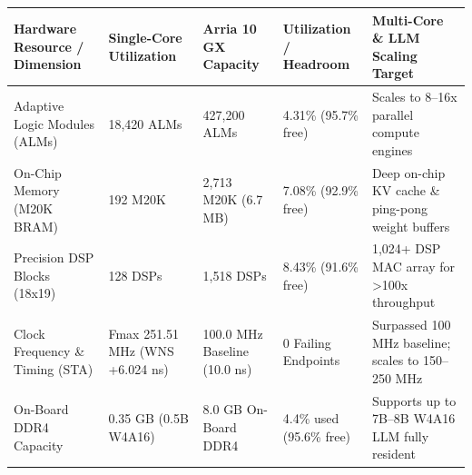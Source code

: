 \documentclass[11pt,a4paper]{article}
\begin{document}
{\footnotesize\renewcommand{\arraystretch}{1.14}\begin{longtable}{@{}L{0.21\textwidth}L{0.16\textwidth}L{0.16\textwidth}L{0.15\textwidth}L{0.22\textwidth}@{}}\toprule

\textbf{Hardware Resource /\allowbreak{} Dimension} & \textbf{Single-Core Utilization} & \textbf{Arria 10 GX Capacity} & \textbf{Utilization /\allowbreak{} Headroom} & \textbf{Multi-Core \& LLM Scaling Target}\\\midrule\endhead

Adaptive Logic Modules (\allowbreak{}ALMs)\allowbreak{} & 18,\allowbreak{}420 ALMs & 427,\allowbreak{}200 ALMs & 4.31\% (\allowbreak{}95.7\% free)\allowbreak{} & Scales to 8--16x parallel compute engines\\[2pt]

On-Chip Memory (\allowbreak{}M20K BRAM)\allowbreak{} & 192 M20K & 2,\allowbreak{}713 M20K (\allowbreak{}6.7 MB)\allowbreak{} & 7.08\% (\allowbreak{}92.9\% free)\allowbreak{} & Deep on-chip KV cache \& ping-pong weight buffers\\[2pt]

Precision DSP Blocks (\allowbreak{}18x19)\allowbreak{} & 128 DSPs & 1,\allowbreak{}518 DSPs & 8.43\% (\allowbreak{}91.6\% free)\allowbreak{} & 1,\allowbreak{}024+\allowbreak{} DSP MAC array for >100x throughput\\[2pt]

Clock Frequency \& Timing (\allowbreak{}STA)\allowbreak{} & Fmax 251.51 MHz (\allowbreak{}WNS +\allowbreak{}6.024 ns)\allowbreak{} & 100.0 MHz Baseline (\allowbreak{}10.0 ns)\allowbreak{} & 0 Failing Endpoints & Surpassed 100 MHz baseline; scales to 150--250 MHz\\[2pt]

On-Board DDR4 Capacity & 0.35 GB (\allowbreak{}0.5B W4A16)\allowbreak{} & 8.0 GB On-Board DDR4 & 4.4\% used (\allowbreak{}95.6\% free)\allowbreak{} & Supports up to 7B--8B W4A16 LLM fully resident\\[2pt]

\bottomrule\end{longtable}}
\end{document}
